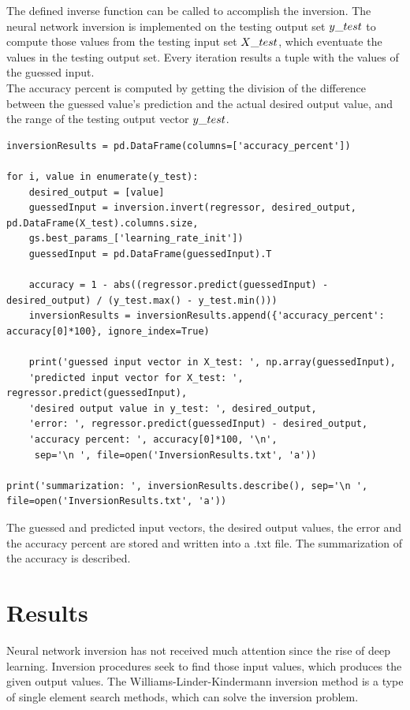 \medskip The defined inverse function can be called to accomplish the inversion. The neural network inversion is implemented on the testing output set $y\char`_test$ to compute those values from the testing input set $X\char`_test$, which eventuate the values in the testing output set. Every iteration results a tuple with the values of the guessed input.\\
The accuracy percent is computed by getting the division of the difference between the guessed value's prediction and the actual desired output value, and the range of the testing output vector $y\char`_test$. 
\begin{lstlisting}
inversionResults = pd.DataFrame(columns=['accuracy_percent'])

for i, value in enumerate(y_test):
	desired_output = [value]
	guessedInput = inversion.invert(regressor, desired_output, pd.DataFrame(X_test).columns.size,
	gs.best_params_['learning_rate_init'])
	guessedInput = pd.DataFrame(guessedInput).T

	accuracy = 1 - abs((regressor.predict(guessedInput) - desired_output) / (y_test.max() - y_test.min()))
	inversionResults = inversionResults.append({'accuracy_percent': accuracy[0]*100}, ignore_index=True)

	print('guessed input vector in X_test: ', np.array(guessedInput),
	'predicted input vector for X_test: ', regressor.predict(guessedInput),
	'desired output value in y_test: ', desired_output,
	'error: ', regressor.predict(guessedInput) - desired_output,
	'accuracy percent: ', accuracy[0]*100, '\n',
	 sep='\n ', file=open('InversionResults.txt', 'a'))

print('summarization: ', inversionResults.describe(), sep='\n ', file=open('InversionResults.txt', 'a'))
\end{lstlisting}
The guessed and predicted input vectors, the desired output values, the error and the accuracy percent are stored and written into a .txt file. The summarization of the accuracy is described.

\newpage

\section{Results}

Neural network inversion has not received much attention since the rise of deep learning. Inversion procedures seek to find those input values, which produces the given output values. The Williams-Linder-Kindermann inversion method is a type of single element search methods, which can solve the inversion problem.\medskip

